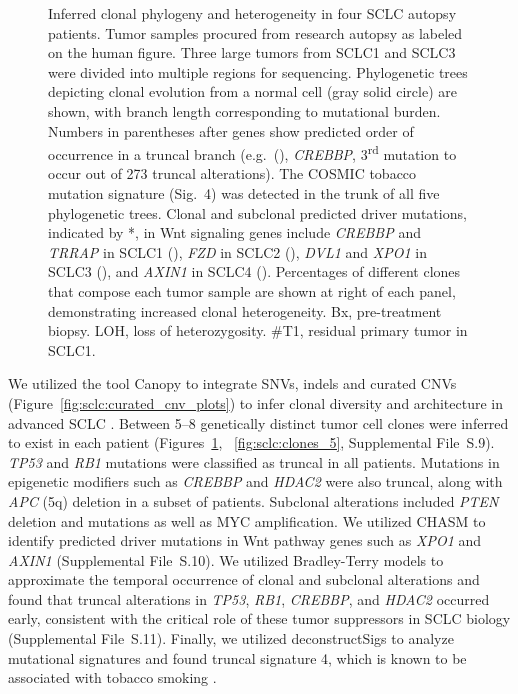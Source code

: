 \begin{figure}[htbp]
    \vspace{-0.5cm}
    \caption[Clonal phylogeny and heterogeneity in four SCLC autopsy patients.]{Inferred clonal phylogeny and heterogeneity in four SCLC autopsy patients. Tumor samples procured from research autopsy as labeled on the human figure. Three large tumors from SCLC1 and SCLC3 were divided into multiple regions for sequencing. Phylogenetic trees depicting clonal evolution from a normal cell (gray solid circle) are shown, with branch length corresponding to mutational burden. Numbers in parentheses after genes show predicted order of occurrence in a truncal branch (e.g.\ (), \textit{CREBBP}, 3\textsuperscript{rd} mutation to occur out of 273 truncal alterations). The COSMIC tobacco mutation signature (Sig.\ 4) was detected in the trunk of all five phylogenetic trees. Clonal and subclonal predicted driver mutations, indicated by *, in Wnt signaling genes include \textit{CREBBP} and \textit{TRRAP} in SCLC1 (), \textit{FZD} in SCLC2 (), \textit{DVL1} and \textit{XPO1} in SCLC3 (), and \textit{AXIN1} in SCLC4 (). Percentages of different clones that compose each tumor sample are shown at right of each panel, demonstrating increased clonal heterogeneity. Bx, pre-treatment biopsy. LOH, loss of heterozygosity. \#T1, residual primary tumor in SCLC1.}
    \label{fig:sclc:clones_1234}
\end{figure}
We utilized the tool Canopy \cite{canopy} to integrate SNVs, indels and curated CNVs (Figure~\ref{fig:sclc:curated_cnv_plots}) to infer clonal diversity and architecture in advanced SCLC \cite{krook2019_mcs}. Between 5--8 genetically distinct tumor cell clones were inferred to exist in each patient (Figures~\ref{fig:sclc:clones_1234}, ~\ref{fig:sclc:clones_5}, Supplemental File~S\thechapter{}.9). \textit{TP53} and \textit{RB1} mutations were classified as truncal in all patients. Mutations in epigenetic modifiers such as \textit{CREBBP} and \textit{HDAC2} were also truncal, along with \textit{APC} (5q) deletion in a subset of patients. Subclonal alterations included \textit{PTEN} deletion and mutations as well as MYC amplification. We utilized CHASM \cite{carter2009} to identify predicted driver mutations in Wnt pathway genes such as \textit{XPO1} and \textit{AXIN1} (Supplemental File~S\thechapter{}.10). We utilized Bradley-Terry models to approximate the temporal occurrence of clonal and subclonal alterations and found that truncal alterations in \textit{TP53}, \textit{RB1}, \textit{CREBBP}, and \textit{HDAC2} occurred early, consistent with the critical role of these tumor suppressors in SCLC biology (Supplemental File~S\thechapter{}.11). Finally, we utilized deconstructSigs \cite{rosenthal16} to analyze mutational signatures and found truncal signature 4, which is known to be associated with tobacco smoking \cite{cosmic_ms}.

